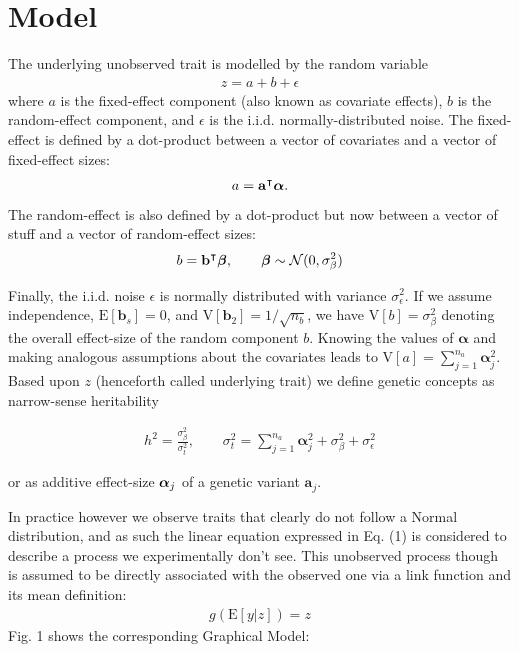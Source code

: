 \section{Model}

The underlying unobserved trait is modelled by the random variable
\begin{align*}
  z = a + b + \epsilon
\end{align*} where $a$ is the fixed-effect
component (also known as covariate effects), $b$ is the random-effect component,
and $\epsilon$ is the i.i.d. normally-distributed noise.
The fixed-effect is defined by a dot-product between a vector of covariates and
a vector of fixed-effect sizes:
\begin{align*}
  a = \mathbf a^\intercal \boldsymbol\alpha.
\end{align*}
The random-effect is also defined by a dot-product but now between
a vector of stuff and a vector of random-effect sizes:
\begin{align*}
  b = \mathbf b^\intercal \boldsymbol\beta, \qquad \boldsymbol\beta \sim \mathcal N(0, \sigma^2_{\beta})
\end{align*}

Finally, the i.i.d. noise $\epsilon$ is normally distributed with variance
$\sigma^2_{\epsilon}$. If we assume independence, $\mathrm E[\mathbf
b_s] = 0$, and $\mathrm V[\mathbf b_2]=1/\sqrt{n_b}$, we have $\mathrm V[b] =
\sigma^2_{\beta}$ denoting the overall effect-size of the random component $b$.
Knowing the values of $\boldsymbol\alpha$ and making analogous
assumptions about the covariates leads to $\mathrm V[a]  =
\sum_{j=1}^{n_a} \boldsymbol \alpha_j^2$.
Based upon $z$ (henceforth called underlying trait) we define genetic concepts
as narrow-sense heritability

\begin{align*}
  h^2=\frac{\sigma^2_{\beta}}{\sigma_t^2}, \qquad \sigma_t^2 =
  \sum_{j=1}^{n_a} \boldsymbol \alpha_j^2 + \sigma^2_{\beta} +
  \sigma^2_{\epsilon}
\end{align*}

or as additive effect-size $\boldsymbol\alpha_j$ of a genetic variant $\mathbf a_j$.

In practice however we observe traits that clearly do not follow a Normal
distribution, and as such the linear equation expressed in Eq. (1) is
considered to describe a process we experimentally don't see.
This unobserved process though is assumed to be directly associated with the
observed one via a link function and its mean definition:
\begin{align*}
  g(\mathrm E[y|z]) = z
\end{align*}
Fig. 1 shows the corresponding Graphical Model:

